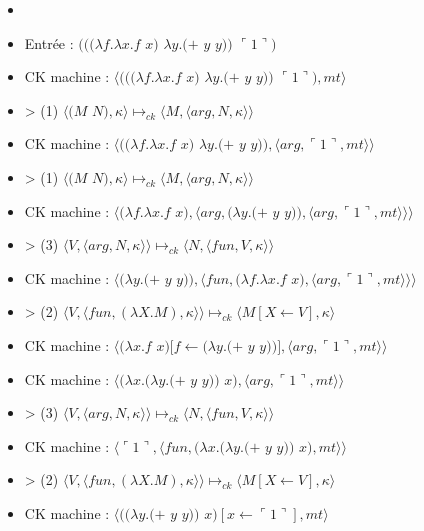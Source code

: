 \documentclass[10pt,a4paper]{article}
\begin{document}
				\begin{itemize}
					\item[]
					\item[] Entrée : $(((\lambda f.\lambda x.f$ $x)$ $\lambda y.(+$ $y$ $y))$ $\ulcorner 1\urcorner)$
					\smallbreak
					\item[] CK machine : $\langle(((\lambda f.\lambda x.f$ $x)$ $\lambda y.(+$ $y$ $y))$ $\ulcorner 1\urcorner),mt\rangle$
					\item[] > (1) $\langle(M$ $N),\kappa\rangle \longmapsto_{ck} \langle M,\langle arg,N,\kappa\rangle\rangle$
					\item[] CK machine : $\langle((\lambda f.\lambda x.f$ $x)$ $\lambda y.(+$ $y$ $y)),\langle arg,\ulcorner 1\urcorner,mt\rangle\rangle$
					\item[] > (1) $\langle(M$ $N),\kappa\rangle \longmapsto_{ck} \langle M,\langle arg,N,\kappa\rangle\rangle$
					\item[] CK machine : $\langle(\lambda f.\lambda x.f$ $x),\langle arg,(\lambda y.(+$ $y$ $y)),\langle arg,\ulcorner 1\urcorner,mt\rangle\rangle\rangle$	
					\item[] > (3) $\langle V,\langle arg,N,\kappa \rangle \rangle \longmapsto_{ck} \langle N,\langle fun,V,\kappa \rangle \rangle$
					\item[] CK machine : $\langle(\lambda y.(+$ $y$ $y)),\langle fun,(\lambda f.\lambda x.f$ $x),\langle arg,\ulcorner 1\urcorner,mt\rangle\rangle\rangle$	
					\item[] > (2) $\langle V,\langle fun,(\lambda X.M),\kappa \rangle \rangle \longmapsto_{ck} \langle M[X \leftarrow V],\kappa\rangle$
					\item[] CK machine : $\langle(\lambda x.f$ $x)[f\leftarrow(\lambda y.(+$ $y$ $y))],\langle arg,\ulcorner 1\urcorner,mt\rangle\rangle$	
					\item[] CK machine : $\langle(\lambda x.(\lambda y.(+$ $y$ $y))$ $x),\langle arg,\ulcorner 1\urcorner,mt\rangle\rangle$	
					\item[] > (3) $\langle V,\langle arg,N,\kappa \rangle \rangle \longmapsto_{ck} \langle N,\langle fun,V,\kappa \rangle \rangle$
					\item[] CK machine : $\langle\ulcorner 1\urcorner,\langle fun,(\lambda x.(\lambda y.(+$ $y$ $y))$ $x),mt\rangle\rangle$
					\item[] > (2) $\langle V,\langle fun,(\lambda X.M),\kappa \rangle \rangle \longmapsto_{ck} \langle M[X \leftarrow V],\kappa\rangle$		
					\item[] CK machine : $\langle((\lambda y.(+$ $y$ $y))$ $x)[x \leftarrow \ulcorner 1\urcorner ],mt\rangle$

\end{itemize}
\end{document}
